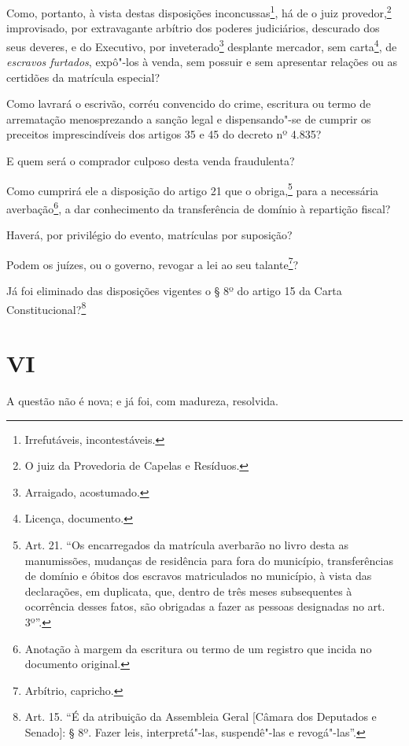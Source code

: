 Como, portanto, à vista destas disposições inconcussas\footnote{
  Irrefutáveis, incontestáveis.}, há de o juiz provedor,\footnote{O
  juiz da Provedoria de Capelas e Resíduos.} improvisado, por
extravagante arbítrio dos poderes judiciários, descurado dos seus
deveres, e do Executivo, por inveterado\footnote{Arraigado,
  acostumado.} desplante mercador, sem carta\footnote{Licença,
  documento.}, de \emph{escravos furtados}, expô"-los à venda, sem
possuir e sem apresentar relações ou as certidões da matrícula especial?

Como lavrará o escrivão, corréu convencido do crime, escritura ou termo
de arrematação menosprezando a sanção legal e dispensando"-se de cumprir
os preceitos imprescindíveis dos artigos 35 e 45 do decreto nº 4.835?

E quem será o comprador culposo desta venda fraudulenta?

Como cumprirá ele a disposição do artigo 21 que o obriga,\footnote{
  Art. 21. ``Os encarregados da matrícula averbarão no livro desta as
  manumissões, mudanças de residência para fora do município,
  transferências de domínio e óbitos dos escravos matriculados no
  município, à vista das declarações, em duplicata, que, dentro de três
  meses subsequentes à ocorrência desses fatos, são obrigadas a fazer as
  pessoas designadas no art. 3º''.} para a necessária averbação\footnote{
  Anotação à margem da escritura ou termo de um registro que incida no
  documento original.}, a dar conhecimento da transferência de domínio à
repartição fiscal?

Haverá, por privilégio do evento, matrículas por suposição?

Podem os juízes, ou o governo, revogar a lei ao seu talante\footnote{
  Arbítrio, capricho.}?

Já foi eliminado das disposições vigentes o § 8º do artigo 15 da Carta
Constitucional?\footnote{Art. 15. ``É da atribuição da Assembleia Geral
  {[}Câmara dos Deputados e Senado{]}: § 8º. Fazer leis, interpretá"-las,
  suspendê"-las e revogá"-las''.}

\section*{VI}

A questão não é nova; e já foi, com madureza, resolvida.

